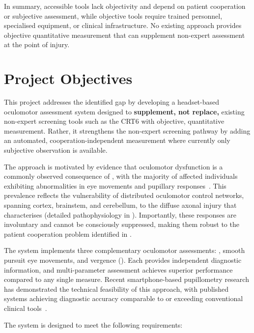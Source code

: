 In summary, accessible tools lack objectivity and depend on patient cooperation or subjective assessment, while objective tools require trained personnel, specialised equipment, or clinical infrastructure. No existing approach provides objective quantitative measurement that can supplement non-expert assessment at the point of injury.


\section{Project Objectives}

This project addresses the identified gap by developing a headset-based oculomotor assessment system designed to \textbf{supplement, not replace,} existing non-expert screening tools such as the CRT6 with objective, quantitative measurement. Rather, it strengthens the non-expert screening pathway by adding an automated, cooperation-independent measurement where currently only subjective observation is available.

The approach is motivated by evidence that oculomotor dysfunction is a commonly observed consequence of , with the majority of affected individuals exhibiting abnormalities in eye movements and pupillary responses~\cite{mcdonald2022eye}. This prevalence reflects the vulnerability of distributed oculomotor control networks, spanning cortex, brainstem, and cerebellum, to the diffuse axonal injury that characterises  (detailed pathophysiology in ). Importantly, these responses are involuntary and cannot be consciously suppressed, making them robust to the patient cooperation problem identified in .

The system implements three complementary oculomotor assessments: , smooth pursuit eye movements, and vergence (). Each provides independent diagnostic information, and multi-parameter assessment achieves superior performance compared to any single measure. Recent smartphone-based pupillometry research has demonstrated the technical feasibility of this approach, with published systems achieving diagnostic accuracy comparable to or exceeding conventional clinical tools~\cite{maxin2024smartphone}.

The system is designed to meet the following requirements:

